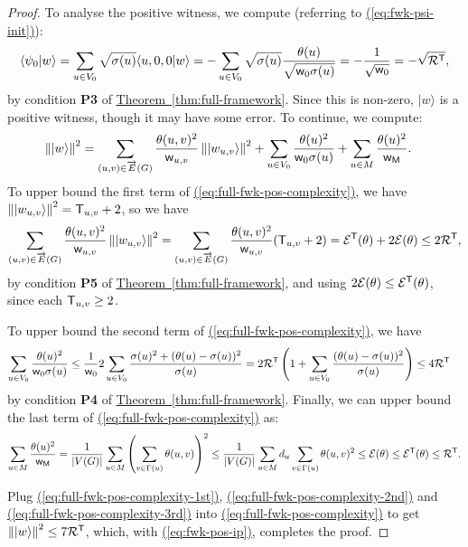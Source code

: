 \documentclass{article}
\newcommand{\eq}[1]{\hyperref[eq:#1]{(\ref*{eq:#1})}}
\newcommand{\thm}[1]{\hyperref[thm:#1]{Theorem~\ref*{thm:#1}}}
\def\ket#1{{\lvert}#1\rangle}
\renewcommand{\>}{\rangle}
\newcommand{\<}{\langle}
\renewcommand{\(}{\left(}
\renewcommand{\)}{\right)}
\def\braket#1#2{{{\langle}#1\vert}#2\rangle}
\def\norm#1{\left\| #1 \right\|}
\def\w{{\sf w}}
\begin{document}
\begin{proof}
To analyse the positive witness, we compute (referring to \eq{fwk-psi-init}): 
\begin{align}
\braket{\psi_0}{w}=\sum_{u\in V_0}\sqrt{\sigma(u)}\braket{u,0,0}{w} = -\sum_{u\in V_0}\sqrt{\sigma(u)}\frac{\theta(u)}{\sqrt{\w_0\sigma(u)}}=-\frac{1}{\sqrt{\w_0}} = -\sqrt{{\cal R}^{\sf T}},\label{eq:fwk-pos-ip}
\end{align}
by condition \textbf{P3} of \thm{full-framework}.
Since this is non-zero, $\ket{w}$ is a positive witness, though it may have some error. To continue, we compute:
\begin{align}
\norm{\ket{w}}^2 &=\sum_{(u,v)\in \overrightarrow{E}(G)}\frac{\theta(u,v)^2}{\w_{u,v}}\norm{\ket{w_{u,v}}}^2+\sum_{u\in{V_0}}\frac{\theta(u)^2}{\w_0\sigma(u)}+\sum_{u\in M}\frac{\theta(u)^2}{\w_{\sf M}}.\label{eq:full-fwk-pos-complexity}
\end{align}
To upper bound the first term of \eq{full-fwk-pos-complexity}, we have $\norm{\ket{w_{u,v}}}^2={\sf T}_{u,v}+2$, so we have
\begin{align}
\sum_{(u,v)\in\overrightarrow{E}(G)}\frac{\theta(u,v)^2}{\w_{u,v}}\norm{\ket{w_{u,v}}}^2 = \sum_{(u,v)\in\overrightarrow{E}(G)}\frac{\theta(u,v)^2}{\w_{u,v}}({\sf T}_{u,v}+2)={\cal E}^{\sf T}(\theta)+2{\cal E}(\theta)\leq 2{\cal R}^{\sf T},\label{eq:full-fwk-pos-complexity-1st}
\end{align}
by condition \textbf{P5} of \thm{full-framework}, and using $2{\cal E}(\theta)\leq {\cal E}^{\sf T}(\theta)$, since each ${\sf T}_{u,v}\geq 2$. 

\noindent To upper bound the second term of \eq{full-fwk-pos-complexity}, we have
\begin{equation}
\begin{split}
\sum_{u\in{V_0}}\frac{\theta(u)^2}{\w_0\sigma(u)} & \leq \frac{1}{\w_0}2\sum_{u\in V_0}\frac{\sigma(u)^2+(\theta(u)-\sigma(u))^2}{\sigma(u)}=
2{\cal R}^{\sf T}\left(1+\sum_{u\in V_0}\frac{(\theta(u)-\sigma(u))^2}{\sigma(u)}\right)
\leq 4{\cal R}^{\sf T}
\end{split}\label{eq:full-fwk-pos-complexity-2nd}
\end{equation}
by condition \textbf{P4} of \thm{full-framework}. 
Finally, we can upper bound the last term of \eq{full-fwk-pos-complexity} as:
\begin{equation}
\sum_{u\in M}\frac{\theta(u)^2}{\w_{\sf M}} = \frac{1}{|V(G)|}\sum_{u\in M}\left(\sum_{v\in \Gamma(u)}\theta(u,v)\right)^2 
\leq \frac{1}{|V(G)|}\sum_{u\in M}d_u\sum_{v\in \Gamma(u)}\theta(u,v)^2
\leq {\cal E}(\theta)\leq {\cal E}^{\sf T}(\theta)\leq {\cal R}^{\sf T}.\label{eq:full-fwk-pos-complexity-3rd}
\end{equation}

\noindent Plug \eq{full-fwk-pos-complexity-1st}, \eq{full-fwk-pos-complexity-2nd} and \eq{full-fwk-pos-complexity-3rd} into \eq{full-fwk-pos-complexity} to get 
$\norm{\ket{w}}^2 \leq 7{\cal R}^{\sf T}$, which, with \eq{fwk-pos-ip}, completes the proof.
\end{proof}
\end{document}
